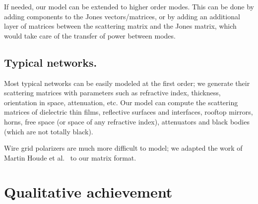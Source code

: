 \documentclass[journal]{IEEEtran}
\begin{document}
If needed, our model can be extended to higher order modes.
This can be done by adding components to the Jones vectors/matrices, or by adding an additional layer of matrices between the scattering matrix and the Jones matrix, which would take care of the transfer of power between modes.

\subsection{Typical networks.}
Most typical networks can be easily modeled at the first order;
we generate their scattering matrices with parameters such as refractive index, thickness, orientation in space, attenuation, etc.
Our model can compute the scattering matrices of dielectric thin films, reflective surfaces and interfaces, rooftop mirrors, horns, free space (or space of any refractive index), attenuators and black bodies (which are not totally black).

Wire grid polarizers are much more difficult to model; we adapted the work of Martin Houde et al.\ \cite{houde_2001} to our matrix format.


\section{Qualitative achievement}
\end{document}
